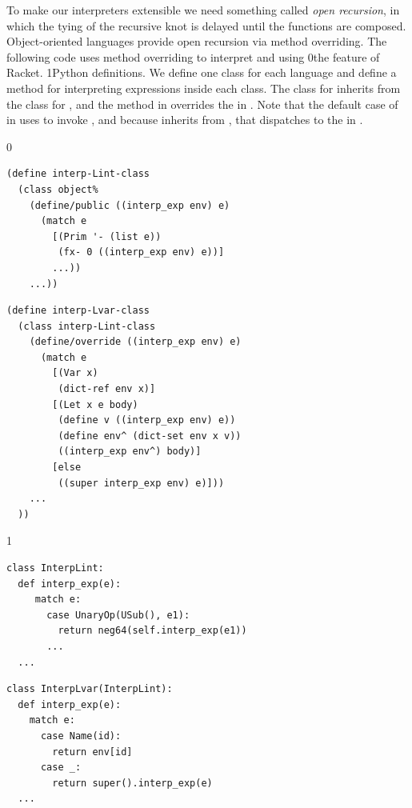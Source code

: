 \documentclass[7x10]{TimesAPriori_MIT}%
\def\racketEd{0}
\def\pythonEd{1}
\providecommand{\BookEdition}{1}
\let\edition\BookEdition
\newcommand{\racket}[1]{{\if\edition\racketEd{#1}\fi}}
\newcommand{\pythonColor}[0]{}
\newcommand{\python}[1]{{\if\edition\pythonEd\pythonColor #1\fi}}
\numberwithin{theorem}{chapter}
\numberwithin{definition}{chapter}
\numberwithin{equation}{chapter}
\begin{document}
To make our interpreters extensible we need something called
\emph{open recursion}, in which the
tying of the recursive knot is delayed until the functions are
composed. Object-oriented languages provide open recursion via method
overriding. The following code uses
method overriding to interpret \LangInt{} and \LangVar{} using
%
\racket{the
  \href{https://docs.racket-lang.org/guide/classes.html}{\code{class}}
  \index{subject}{class} feature of Racket.}%
%
\python{Python  definitions.}
%
We define one class for each language and define a method for
interpreting expressions inside each class. The class for \LangVar{}
inherits from the class for \LangInt{}, and the method
 in \LangVar{} overrides the  in
\LangInt{}. Note that the default case of  in
\LangVar{} uses  to invoke , and because
\LangVar{} inherits from \LangInt{}, that dispatches to the
 in \LangInt{}.
\begin{center}
  \hspace{-20pt}
{\if\edition\racketEd  
\begin{minipage}{0.45\textwidth}
\begin{lstlisting}
(define interp-Lint-class
  (class object%
    (define/public ((interp_exp env) e)
      (match e
        [(Prim '- (list e))
         (fx- 0 ((interp_exp env) e))]
        ...))
    ...))
\end{lstlisting}
\end{minipage}
\begin{minipage}{0.45\textwidth}
  \begin{lstlisting}
(define interp-Lvar-class
  (class interp-Lint-class
    (define/override ((interp_exp env) e)
      (match e
        [(Var x)
         (dict-ref env x)]
        [(Let x e body)
         (define v ((interp_exp env) e))
         (define env^ (dict-set env x v))
         ((interp_exp env^) body)]
        [else
         ((super interp_exp env) e)]))
    ...
  ))
\end{lstlisting}
\end{minipage}
\fi}
{\if\edition\pythonEd\pythonColor
\begin{minipage}{0.45\textwidth}
\begin{lstlisting}
class InterpLint:
  def interp_exp(e):
     match e:
       case UnaryOp(USub(), e1):
         return neg64(self.interp_exp(e1))
       ...
  ...
\end{lstlisting}
\end{minipage}
\begin{minipage}{0.45\textwidth}
  \begin{lstlisting}
class InterpLvar(InterpLint):
  def interp_exp(e):
    match e:
      case Name(id):
        return env[id]
      case _:
        return super().interp_exp(e)
  ...
\end{lstlisting}
\end{minipage}
\fi}
\end{center}
\end{document}
